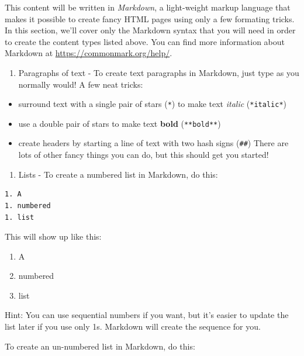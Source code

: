 \documentclass[]{book}
\providecommand{\tightlist}{%
  \setlength{\itemsep}{0pt}\setlength{\parskip}{0pt}}
\begin{document}
This content will be written in \emph{Markdown}, a light-weight markup language that makes it possible to create
fancy HTML pages using only a few formating tricks. In this section, we'll cover only the Markdown syntax that
you will need in order to create the content types listed above. You can find more information about Markdown
at \url{https://commonmark.org/help/}.

\begin{enumerate}
\def\labelenumi{\arabic{enumi}.}
\tightlist
\item
  Paragraphs of text - To create text paragraphs in Markdown, just type as you normally would! A few neat tricks:
\end{enumerate}

\begin{itemize}
\tightlist
\item
  surround text with a single pair of stars (\texttt{*}) to make text \emph{italic} (\texttt{*italic*})
\item
  use a double pair of stars to make text \textbf{bold} (\texttt{**bold**})
\item
  create headers by starting a line of text with two hash signs (\texttt{\#\#})
  There are lots of other fancy things you can do, but this should get you started!
\end{itemize}

\begin{enumerate}
\def\labelenumi{\arabic{enumi}.}
\tightlist
\item
  Lists - To create a numbered list in Markdown, do this:
\end{enumerate}

\begin{verbatim}
1. A
1. numbered
1. list
\end{verbatim}

This will show up like this:

\begin{enumerate}
\def\labelenumi{\arabic{enumi}.}
\tightlist
\item
  A
\item
  numbered
\item
  list
\end{enumerate}

Hint: You can use sequential numbers if you want, but it's easier to update the list later if you use only 1s.
Markdown will create the sequence for you.

To create an un-numbered list in Markdown, do this:
\end{document}
